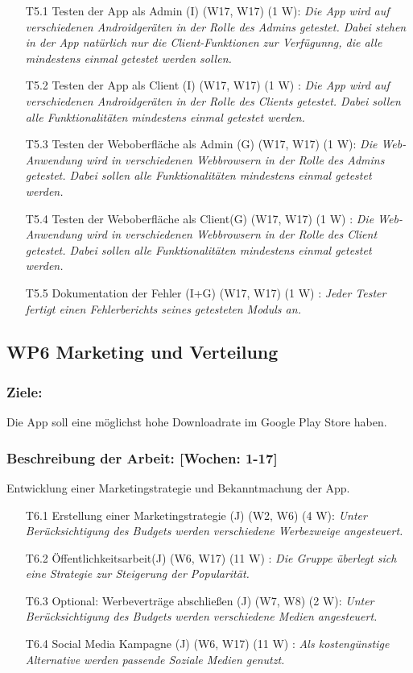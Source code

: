 \documentclass{report}
\begin{document}
\begin{enumerate}
\item [T5.1] Testen der App als Admin (I) (W17, W17) (1 W): \emph{ Die App wird auf verschiedenen Androidgeräten in der Rolle des Admins getestet. Dabei stehen in der App natürlich nur die Client-Funktionen zur Verfügunng, die alle mindestens einmal getestet werden sollen.}
\item [T5.2] Testen der App als Client (I) (W17, W17) (1 W) : \emph{ Die App wird auf verschiedenen Androidgeräten in der Rolle des Clients getestet. Dabei sollen alle Funktionalitäten mindestens einmal getestet werden.}
\item [T5.3] Testen der Weboberfläche als Admin (G) (W17, W17) (1 W): \emph{ Die Web-Anwendung wird in verschiedenen Webbrowsern in der Rolle des Admins getestet. Dabei sollen alle Funktionalitäten mindestens einmal getestet werden.}
\item [T5.4] Testen der Weboberfläche als Client(G) (W17, W17) (1 W) : \emph{ Die Web-Anwendung wird in verschiedenen Webbrowsern in der Rolle des Client getestet. Dabei sollen alle Funktionalitäten mindestens einmal getestet werden.}
\item [T5.5] Dokumentation der Fehler (I+G) (W17, W17) (1 W) : \emph{Jeder Tester fertigt einen Fehlerberichts seines getesteten Moduls an.}
\end{enumerate}

\subsection*{WP6 Marketing und Verteilung}

\subsubsection{Ziele:} Die App soll eine möglichst hohe Downloadrate im Google Play Store haben.
\subsubsection{Beschreibung der Arbeit: [Wochen: 1-17]} Entwicklung einer Marketingstrategie und Bekanntmachung der App.

\begin{enumerate}
\item [T6.1] Erstellung einer Marketingstrategie (J) (W2, W6) (4 W): \emph{Unter Berücksichtigung des Budgets werden verschiedene Werbezweige angesteuert.}
\item [T6.2] Öffentlichkeitsarbeit(J) (W6, W17) (11 W) : \emph{ Die Gruppe überlegt sich eine Strategie zur Steigerung der Popularität.}
\item [T6.3] Optional: Werbeverträge abschließen (J) (W7, W8) (2 W): \emph{ Unter Berücksichtigung des Budgets werden verschiedene Medien angesteuert.}
\item [T6.4] Social Media Kampagne (J) (W6, W17) (11 W) : \emph{ Als kostengünstige Alternative werden passende Soziale Medien genutzt.}
\end{enumerate}
\end{document}

